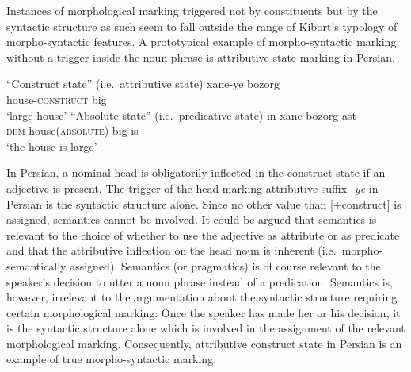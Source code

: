 Instances of morphological marking triggered not by constituents but by the syntactic structure as such seem to fall outside the range of Kibort's typology of morpho-syntactic features. A prototypical example of morpho-syntactic marking without a trigger inside the noun phrase is attributive state marking in Persian.
\begin{exe}
\label{persian state}
\begin{xlist}
\ex “Construct state” (i.e.~attributive state)
\gll 	xane-ye bozorg\\
	house-\textsc{construct} big\\
\glt 	‘large house’
\ex “Absolute state” (i.e.~predicative state)
\gll	in xane bozorg ast\\
	\textsc{dem} house(\textsc{absolute}) big is\\
\glt	‘the house is large’
\end{xlist}
\end{exe}
In Persian, a nominal head is obligatorily inflected in the construct state if an adjective is present. The trigger of the head-marking attributive suffix \textit{-ye} in Persian is the syntactic structure alone. Since no other value than [+construct] is assigned, semantics cannot be involved. It could be argued that semantics is relevant to the choice of whether to use the adjective as attribute or as predicate and that the attributive inflection on the head noun is inherent (i.e.~morpho-semantically assigned). Semantics (or pragmatics) is of course relevant to the speaker's decision to utter a noun phrase instead of a predication. Semantics is, however, irrelevant to the argumentation about the syntactic structure requiring certain morphological marking: Once the speaker has made her or his decision, it is the syntactic structure alone which is involved in the assignment of the relevant morphological marking. Consequently, attributive construct state in Persian is an example of true morpho-syntactic marking.

